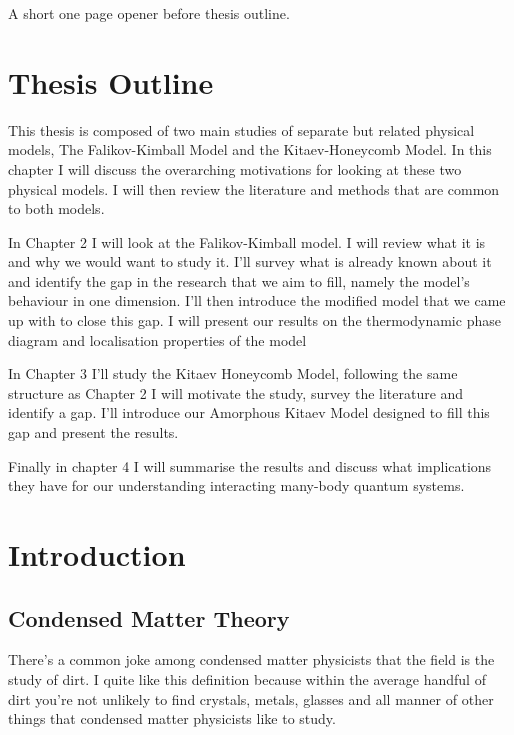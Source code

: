 A short one page opener before thesis outline.


\section{Thesis Outline}
This thesis is composed of two main studies of separate but related physical models, The Falikov-Kimball Model and the Kitaev-Honeycomb Model. In this chapter I will discuss the overarching motivations for looking at these two physical models. I will then review the literature and methods that are common to both models.

In Chapter 2 I will look at the Falikov-Kimball model. I will review what it is and why we would want to study it. I'll survey what is already known about it and identify the gap in the research that we aim to fill, namely the model's behaviour in one dimension. I'll then introduce the modified model that we came up with to close this gap. I will present our results on the thermodynamic phase diagram and localisation properties of the model

In Chapter 3 I'll study the Kitaev Honeycomb Model, following the same structure as Chapter 2 I will motivate the study, survey the literature and identify a gap. I'll introduce our Amorphous Kitaev Model designed to fill this gap and present the results.

Finally in chapter 4 I will summarise the results and discuss what implications they have for our understanding interacting many-body quantum systems.

\section{Introduction}
\subsection{Condensed Matter Theory}


There's a common joke among condensed matter physicists that the field is the study of dirt. I quite like this definition because within the average handful of dirt you're not unlikely to find crystals, metals, glasses and all manner of other things that condensed matter physicists like to study. 

